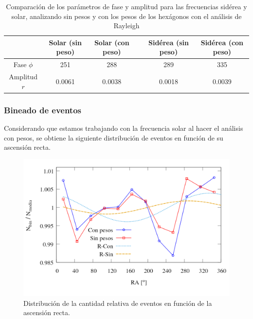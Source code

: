 		
		\begin{table}[H]
		\centering
		\begin{tabular}{c|c|c|c|c|c}
					& Solar (sin peso)	& Solar (con peso)	&& Sidérea (sin peso) 	& Sidérea (con peso)	 \\ \hline
		Fase $\phi$ & 251	    		& 288	    		&& 289				& 335				\\
		Amplitud $r$& 0.0061	    	& 0.0038	  		&&0.0018		& 0.0039			\\
		\end{tabular}
		\caption{Comparación de los parámetros de fase y amplitud para las frecuencias sidérea y solar, analizando sin pesos y con los pesos de los hexágonos con el análisis de Rayleigh}
		\end{table}


	\subsubsection{Bineado de eventos }


	Considerando que estamos trabajando con la frecuencia solar al hacer el análisis con pesos, se obtiene la siguiente distribución de eventos en función de su ascensión recta.
	\begin{figure}[H]
		\centering
		\includegraphics[width=0.75\linewidth]{eventos_clasificados_por_RA_v4.png}
		\caption{Distribución de la cantidad relativa de eventos en función de la ascensión recta.}
	\end{figure}







